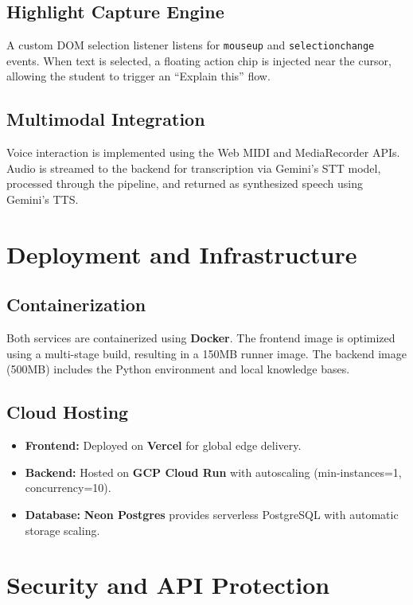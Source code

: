 \subsection{Highlight Capture Engine}
A custom DOM selection listener listens for \texttt{mouseup} and \texttt{selectionchange} events. When text is selected, a floating action chip is injected near the cursor, allowing the student to trigger an ``Explain this'' flow.

\subsection{Multimodal Integration}
Voice interaction is implemented using the Web MIDI and MediaRecorder APIs. Audio is streamed to the backend for transcription via Gemini's STT model, processed through the pipeline, and returned as synthesized speech using Gemini's TTS.

\section{Deployment and Infrastructure}

\subsection{Containerization}
Both services are containerized using \textbf{Docker}. The frontend image is optimized using a multi-stage build, resulting in a 150MB runner image. The backend image (500MB) includes the Python environment and local knowledge bases.

\subsection{Cloud Hosting}
\begin{itemize}
    \item \textbf{Frontend:} Deployed on \textbf{Vercel} for global edge delivery.
    \item \textbf{Backend:} Hosted on \textbf{GCP Cloud Run} with autoscaling (min-instances=1, concurrency=10).
    \item \textbf{Database:} \textbf{Neon Postgres} provides serverless PostgreSQL with automatic storage scaling.
\end{itemize}

\section{Security and API Protection}

